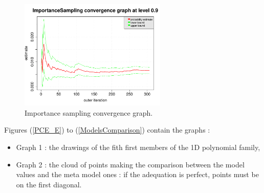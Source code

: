 \documentclass[11pt]{article}
\begin{document}
\begin{figure}[Hhbtp]
  \begin{minipage}{9.8cm}
    \begin{center}
      \includegraphics[width=7cm]{Figures/convergenceGrapheIS.pdf}
      \caption{Importance sampling convergence graph.}
      \label{ISConvergence}
    \end{center}
  \end{minipage}
\end{figure}


Figures (\ref{PCE_E}) to (\ref{ModelsComparison}) contain the graphs :

\begin{itemize}
\item Graph 1 : the drawings of the fith first members of the 1D polynomial family,
\item Graph 2 : the cloud of points making the comparison between the model values and the meta model ones : if the adequation is perfect, points must be on the first diagonal.
\end{itemize}
\end{document}
